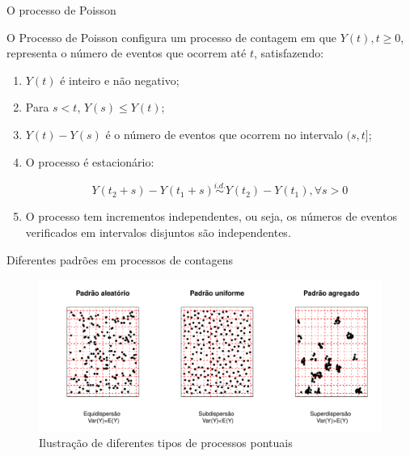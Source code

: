 \documentclass[10pt, aspectratio=169]{beamer}
\begin{document}
\begin{frame}{O processo de Poisson}
    
    O Processo de Poisson configura um processo de contagem em que $Y(t),t\geqslant 0$, representa o número de eventos que ocorrem até $t$, satisfazendo:
    
    \vspace{0,5cm}
    
    \begin{enumerate}
        \item $Y(t)$ é inteiro e não negativo;
        \item Para $s<t$, $Y(s)\leq Y(t)$;
        \item $Y(t)-Y(s)$ é o número de eventos que ocorrem no intervalo $(s,t]$;
        \item O processo é estacionário:
        
        $$
            Y(t_{2}+s)-Y(t_{1}+s) \overset{i.d. }{\sim}Y(t_{2})-Y(t_{1}), \forall s>0
       $$
        
        \item O processo tem incrementos independentes, ou seja, os números de eventos verificados em intervalos disjuntos são independentes.
    \end{enumerate}

\end{frame}




\begin{frame}{Diferentes padrões em processos de contagens}
    
\begin{figure}[h]
    \includegraphics[scale=0.6]{images/processos14.pdf}
    \caption{Ilustração de diferentes tipos de processos pontuais}
    \label{Fig2}
    \centering
    
\end{figure}
\end{frame}
\end{document}

